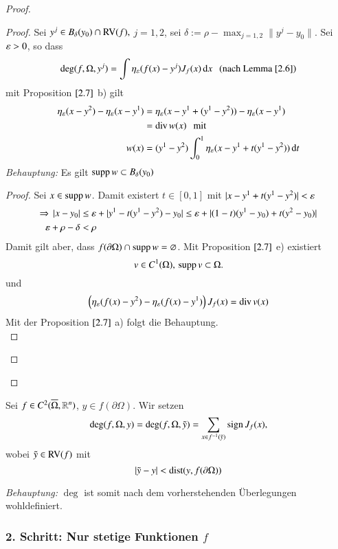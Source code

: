 \begin{proof}
\begin{description}
    \begin{proof}
        Sei $y^j\in B_\delta (y_0)\cap \mathrm{RV}(f),$ $j=1,2$, sei $\delta := \rho-\max_{j=1,2}\|y^j-y_0\|$.
        Sei $\varepsilon>0$, so dass
        \[
            \deg(f,\Omega,y^j)=\int \eta_\varepsilon(f(x)-y^j)J_f(x) \, \mathrm{d} x \hspace{.25cm} \text{(nach Lemma $\ref{2.6}$)}
        \]
        mit Proposition $\ref{2.7}$ b) gilt
        \begin{align*}
            \eta_\varepsilon(x-y^2)-\eta_\varepsilon(x-y^1)&= \eta_\varepsilon (x-y^1+(y^1-y^2))-\eta_\varepsilon(x-y^1)\\
            &= \mathrm{div}\, w(x) \hspace{.25cm}\text{mit}\\
            w(x)&= (y^1-y^2)\int_0^1 \eta_\varepsilon (x-y^1+t(y^1-y^2))\, \mathrm{d} t
        \end{align*}
    \textit{Behauptung:} Es gilt $\mathrm{supp}\, w\subset B_\delta(y_0)$
    \begin{proof}
        Sei $x\in \mathrm{supp}\, w$. Damit existert $t\in [0,1]$ mit $|x-y^1+t(y^1-y^2)|<\varepsilon$
        \begin{align*}
            \Rightarrow \, |x-y_0|&\leq \varepsilon + |y^1-t(y^1-y^2)-y_0|\leq \varepsilon +|(1-t)(y^1-y_0)+t(y^2-y_0)|\\
                \varepsilon + \rho-\delta&<\rho
        \end{align*}
        Damit gilt aber, dass $f(\partial \Omega)\cap \mathrm{supp}\, w=\varnothing$. Mit Proposition 
        $\ref{2.7}$ e) existiert
        \[
            v\in C^1(\Omega),\, \mathrm{supp}\, v \subset \Omega.
        \]
        und
        \[
            \left( \eta_\varepsilon(f(x)-y^2)-\eta_\varepsilon (f(x)-y^1) \right)J_f(x)=\mathrm{div}\, v(x)
        \]
        Mit der Proposition $\ref{2.7}$ a) folgt die Behauptung. \[  \]
    \end{proof}

    \end{proof}
    \end{description}
\end{proof}

\begin{defi}\label{2.9}
    Sei $f\in C^2(\overline \Omega,\mathbb{R}^n)$, $y\in f(\partial \Omega)$. Wir setzen
    \[
        \deg (f,\Omega,y)= \deg(f,\Omega,\tilde y)=\sum_{x\in f^{-1}(\tilde y)} \mathrm{sign}\, J_f(x),
    \]
    wobei $\tilde y \in \mathrm{RV}(f)$ mit
    \[
        |\tilde y- y| < \mathrm{dist}(y,f(\partial \Omega))
    \]
\end{defi}

\noindent\textit{Behauptung:} $\deg$ ist somit nach dem vorherstehenden Überlegungen wohldefiniert.
\subsubsection*{2. Schritt: Nur stetige Funktionen $f$}

